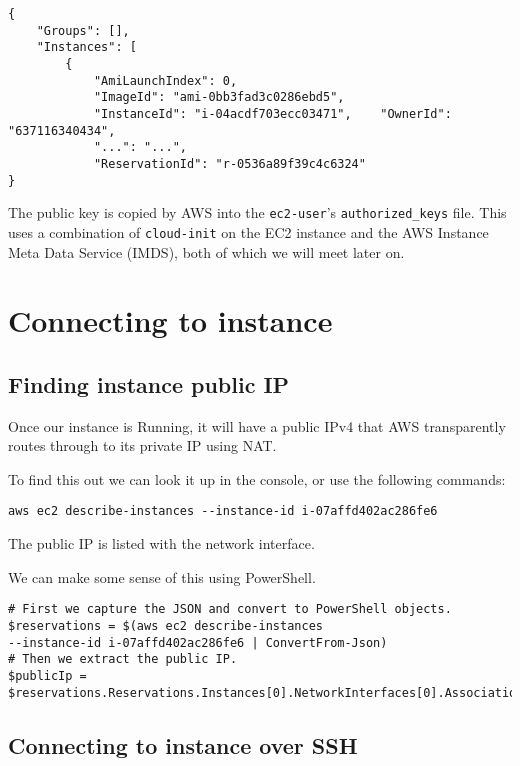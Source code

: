 \begin{verbatim}
{
    "Groups": [],
    "Instances": [
        {
            "AmiLaunchIndex": 0,
            "ImageId": "ami-0bb3fad3c0286ebd5",
            "InstanceId": "i-04acdf703ecc03471",    "OwnerId": "637116340434",
            "...": "...",
            "ReservationId": "r-0536a89f39c4c6324"
}
\end{verbatim}

The public key is copied by AWS into the \texttt{ec2-user}'s
\texttt{authorized\_keys} file. This uses a combination of
\texttt{cloud-init} on the EC2 instance and the AWS Instance Meta Data
Service (IMDS), both of which we will meet later on.

\section{Connecting to instance}\label{sec:connecting-to-instance}

\subsection{Finding instance public
IP}\label{sec:finding-instance-public-ip}

Once our instance is Running, it will have a public IPv4 that AWS
transparently routes through to its private IP using NAT.

To find this out we can look it up in the console, or use the following
commands:

\begin{verbatim}
aws ec2 describe-instances --instance-id i-07affd402ac286fe6
\end{verbatim}

The public IP is listed with the network interface.

We can make some sense of this using PowerShell.

\begin{verbatim}
# First we capture the JSON and convert to PowerShell objects.
$reservations = $(aws ec2 describe-instances 
--instance-id i-07affd402ac286fe6 | ConvertFrom-Json)
# Then we extract the public IP.
$publicIp = $reservations.Reservations.Instances[0].NetworkInterfaces[0].Association.publicIp
\end{verbatim}

\subsection{Connecting to instance over
SSH}\label{sec:connecting-to-instance-over-ssh}

